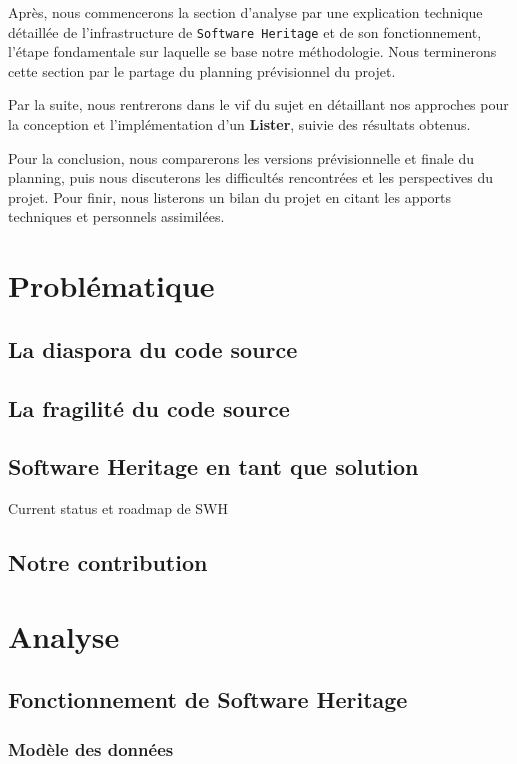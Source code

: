 \documentclass[12pt,a4paper]{report}
\begin{document}
Après, nous commencerons la section d'analyse par une explication technique détaillée de l'infrastructure de \texttt{Software Heritage} et de son fonctionnement, l'étape fondamentale sur laquelle se base notre méthodologie. Nous terminerons cette section par le partage du planning prévisionnel du projet.

Par la suite, nous rentrerons dans le vif du sujet en détaillant nos approches pour la conception et l'implémentation d'un \textbf{Lister}, suivie des résultats obtenus.

Pour la conclusion, nous comparerons les versions prévisionnelle et finale du planning, puis nous discuterons les difficultés rencontrées et les perspectives du projet. Pour finir, nous listerons un bilan du projet en citant les apports techniques et personnels assimilées.

\chapter{Problématique}
\section{La diaspora du code source}

\section{La fragilité du code source}

\section{Software Heritage en tant que solution}
	Current status et roadmap de SWH

\section{Notre contribution}

\chapter{Analyse}
\section{Fonctionnement de Software Heritage}

\subsection{Modèle des données}
\end{document}
